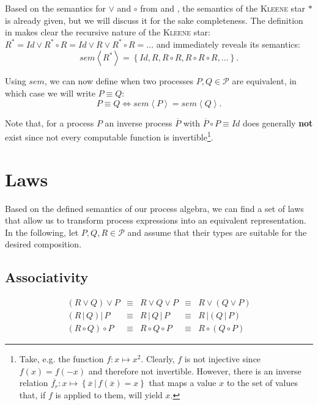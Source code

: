 Based on the semantics for $\vee$ and $\circ$ from  and , the semantics of the \textsc{Kleene} star $*$ is already given, but we will discuss it for the sake completeness. The definition in  makes clear the recursive nature of the \textsc{Kleene} star: $R^* = Id \vee R^* \circ R = Id \vee R \vee R^* \circ R =  ...$ and immediately reveals its semantics:
\begin{equation}
  \label{eqn:sem_kleene}
  sem \left\langle R^* \right\rangle = \left\{ Id, R, R \circ R, R \circ R \circ R, ... \right\}.
\end{equation}

Using $sem$, we can now define when two processes $P, Q \in \mathcal{P}$ are equivalent, in which case we will write $P \equiv Q$:
\begin{equation}
  \label{eqn:equivalence}
  P \equiv Q \Leftrightarrow sem \left\langle P \right\rangle = sem \left\langle Q \right\rangle.
\end{equation}



Note that, for a process $P$ an inverse process $\overline{P}$ with $\overline{P} \circ P \equiv Id$ does generally \textbf{not} exist since not every computable function is invertible\footnote{Take, e.g. the function $f \colon x \mapsto x^2$. Clearly, $f$ is not injective since $f \left( x \right) = f \left( -x \right)$ and therefore not invertible. However, there is an inverse relation $\overline{f_r} \colon x \mapsto \left\{ \overline{x} \,|\, f \left( \overline{x} \right) = x \right\}$ that maps a value $x$ to the set of values that, if $f$ is applied to them, will yield $x$.}.

\section{Laws}
\label{chp:laws}
Based on the defined semantics of our process algebra, we can find a set of laws that allow us to transform process expressions into an equivalent representation. In the following, let $P, Q, R \in \mathcal{P}$ and assume that their types are suitable for the desired composition.

\subsection{Associativity}
\begin{equation*}
\begin{array}{rcccl}
  \left( R \vee Q \right) \vee P & \equiv & R \vee Q \vee P & \equiv & R \vee \left( Q \vee P \right) \\
  \left( R \,|\, Q \right) |\, P & \equiv & R \,|\, Q \,|\, P & \equiv & R \,| \left( Q \,|\, P \right) \\
  \left( R \circ Q \right) \circ P & \equiv & R \circ Q \circ P & \equiv & R \circ \left( Q \circ P \right)
\end{array}
\end{equation*}

